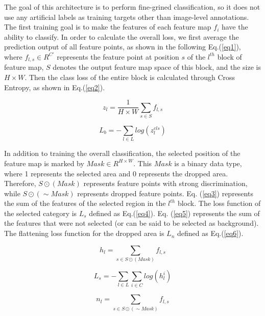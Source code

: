 \documentclass[conference]{IEEEtran}
\begin{document}
The goal of this architecture is to perform fine-grined classification, so it does not use any artificial labels as training targets other than image-level annotations. The first training goal is to make the features of each feature map $f_{i}$ have the ability to classify. In order to calculate the overall loss, we first average the prediction output of all feature points, as shown in the following Eq.(\ref{eq1}), where $f_{l,s} \in R^{C\prime}$ represents the feature point at position $s$ of the $l^{th}$ block of feature map, $S$ denotes the output feature map space of this block, and the size is $H\times W$. Then the class loss of the entire block is calculated through Cross Entropy, as shown in Eq.(\ref{eq2}).

\begin{equation} \label{eq1}
    z_{l} = \frac{1}{H \times W} \sum_{s \in S} f_{l,s}
\end{equation}

\begin{equation} \label{eq2}
    L_{b} = - \sum_{l \in L} log(z^{cls} _{l})
\end{equation}

In addition to training the overall classification, the selected position of the feature map is marked by $Mask \in R^{H \times W}$. This $Mask$ is a binary data type, where 1 represents the selected area and 0 represents the dropped area. Therefore, $S \odot (Mask)$ represents feature points with strong discrimination, while $S \odot (\sim Mask)$ represents dropped feature points. Eq. (\ref{eq3}) represents the sum of the features of the selected region in the $l^{th}$ block. The loss function of the selected category is $L_s$ defined as Eq.(\ref{eq4}). Eq. (\ref{eq5}) represents the sum of the features that were not selected (or can be said to be selected as background). The flattening loss function for the dropped area is $L_n$ defined as Eq.(\ref{eq6}). 

\begin{equation} \label{eq3}
    h_{l} = \sum_{s \in S \odot(Mask)} f_{l,s}
\end{equation}

\begin{equation} \label{eq4}
    L_{s} = - \sum_{l \in L} \sum_{i \in C} log(h^{i}_{l})
\end{equation}

\begin{equation} \label{eq5}
    n_{l} = \sum_{s \in S \odot(\sim Mask)} f_{l,s}
\end{equation}
\end{document}
